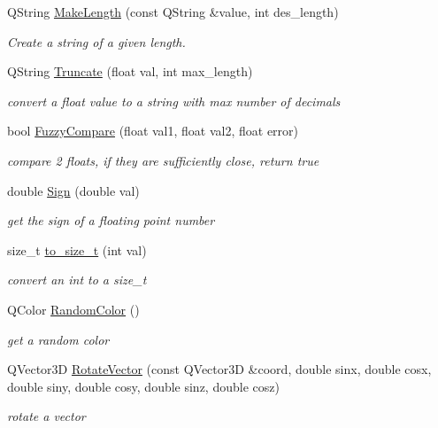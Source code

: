\begin{DoxyCompactItemize}
Q\+String \hyperlink{namespaceShipCAD_ab520595d533b1626c8be82c0efd24e6d}{Make\+Length} (const Q\+String \&value, int des\+\_\+length)
\begin{DoxyCompactList}\small\item\em Create a string of a given length. \end{DoxyCompactList}\item 
Q\+String \hyperlink{namespaceShipCAD_a646812cc2b9066dfc47f2ed7e1faa955}{Truncate} (float val, int max\+\_\+length)
\begin{DoxyCompactList}\small\item\em convert a float value to a string with max number of decimals \end{DoxyCompactList}\item 
bool \hyperlink{namespaceShipCAD_ae1b7d6603b6c5a2969befdbd629f2e8b}{Fuzzy\+Compare} (float val1, float val2, float error)
\begin{DoxyCompactList}\small\item\em compare 2 floats, if they are sufficiently close, return true \end{DoxyCompactList}\item 
double \hyperlink{namespaceShipCAD_ad4bf48489d173fd29503cd9b511f52e9}{Sign} (double val)
\begin{DoxyCompactList}\small\item\em get the sign of a floating point number \end{DoxyCompactList}\item 
size\+\_\+t \hyperlink{namespaceShipCAD_a26237f4689cbf7e356c7c1ce3f9c69ff}{to\+\_\+size\+\_\+t} (int val)
\begin{DoxyCompactList}\small\item\em convert an int to a size\+\_\+t \end{DoxyCompactList}\item 
Q\+Color \hyperlink{namespaceShipCAD_a6bc9d2025502c6f4052b89c82c72762c}{Random\+Color} ()
\begin{DoxyCompactList}\small\item\em get a random color \end{DoxyCompactList}\item 
Q\+Vector3D \hyperlink{namespaceShipCAD_af88f847dc1803cadbeb655783961dbfd}{Rotate\+Vector} (const Q\+Vector3D \&coord, double sinx, double cosx, double siny, double cosy, double sinz, double cosz)
\begin{DoxyCompactList}\small\item\em rotate a vector \end{DoxyCompactList}\item 

\end{DoxyCompactItemize}
